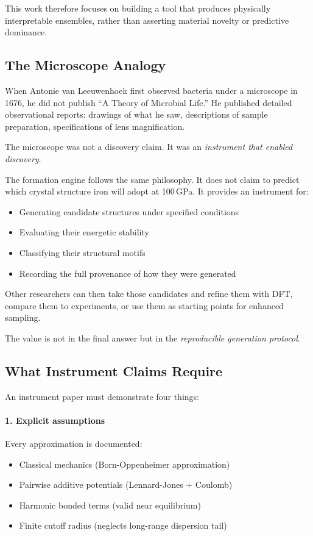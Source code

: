 \documentclass[11pt]{article}
\begin{document}
This work therefore focuses on building a tool that produces physically interpretable ensembles, rather than asserting material novelty or predictive dominance.

\subsection{The Microscope Analogy}

When Antonie van Leeuwenhoek first observed bacteria under a microscope in 1676, he did not publish ``A Theory of Microbial Life.'' He published detailed observational reports: drawings of what he saw, descriptions of sample preparation, specifications of lens magnification.

The microscope was not a discovery claim. It was an \textit{instrument that enabled discovery}.

The formation engine follows the same philosophy. It does not claim to predict which crystal structure iron will adopt at 100\,GPa. It provides an instrument for:

\begin{itemize}
\item Generating candidate structures under specified conditions
\item Evaluating their energetic stability
\item Classifying their structural motifs
\item Recording the full provenance of how they were generated
\end{itemize}

Other researchers can then take those candidates and refine them with DFT, compare them to experiments, or use them as starting points for enhanced sampling.

The value is not in the final answer but in the \textit{reproducible generation protocol}.

\subsection{What Instrument Claims Require}

An instrument paper must demonstrate four things:

\paragraph{1. Explicit assumptions}

Every approximation is documented:
\begin{itemize}
\item Classical mechanics (Born-Oppenheimer approximation)
\item Pairwise additive potentials (Lennard-Jones + Coulomb)
\item Harmonic bonded terms (valid near equilibrium)
\item Finite cutoff radius (neglects long-range dispersion tail)
\end{itemize}
\end{document}
